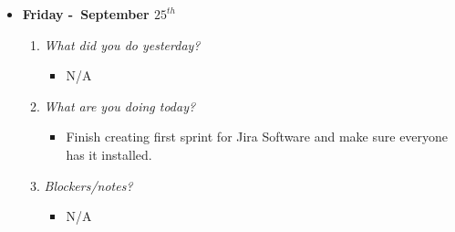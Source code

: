 \begin{itemize}
  \item[] \textbf{\large Friday -\ September \(25^{th}\)}
  \begin{enumerate}
    \item \textsl{What did you do yesterday?}
    \begin{itemize}
      \item N/A
    \end{itemize}
    \item \textsl{What are you doing today?}
    \begin{itemize}
      \item Finish creating first sprint for Jira Software and make sure everyone has it installed.
    \end{itemize}
    \item \textsl{Blockers/notes?}
    \begin{itemize}
      \item N/A
    \end{itemize}
  \end{enumerate}
\end{itemize}